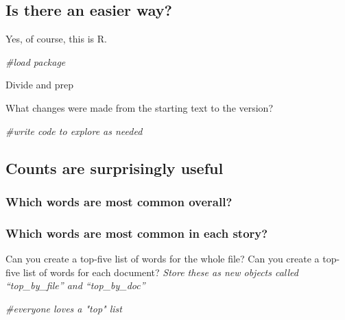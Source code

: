 \documentclass[
]{article}
\newenvironment{Shaded}{\begin{snugshade}}{\end{snugshade}}
\newcommand{\CommentTok}[1]{\textcolor[rgb]{0.56,0.35,0.01}{\textit{#1}}}
\begin{document}
\hypertarget{is-there-an-easier-way}{%
\subsection{Is there an easier way?}\label{is-there-an-easier-way}}

Yes, of course, this is R.

\begin{Shaded}
\begin{Highlighting}[]
\CommentTok{\#load package}
\end{Highlighting}
\end{Shaded}

Divide and prep

What changes were made from the starting text to the version?

\begin{Shaded}
\begin{Highlighting}[]
\CommentTok{\#write code to explore as needed}
\end{Highlighting}
\end{Shaded}

\hypertarget{counts-are-surprisingly-useful}{%
\subsection{Counts are surprisingly
useful}\label{counts-are-surprisingly-useful}}

\hypertarget{which-words-are-most-common-overall}{%
\subsubsection{Which words are most common
overall?}\label{which-words-are-most-common-overall}}

\hypertarget{which-words-are-most-common-in-each-story}{%
\subsubsection{Which words are most common in each
story?}\label{which-words-are-most-common-in-each-story}}

Can you create a top-five list of words for the whole file? Can you
create a top-five list of words for each document? \emph{Store these as
new objects called ``top\_by\_file'' and ``top\_by\_doc''}

\begin{Shaded}
\begin{Highlighting}[]
\CommentTok{\#everyone loves a "top" list}
\end{Highlighting}
\end{Shaded}
\end{document}
